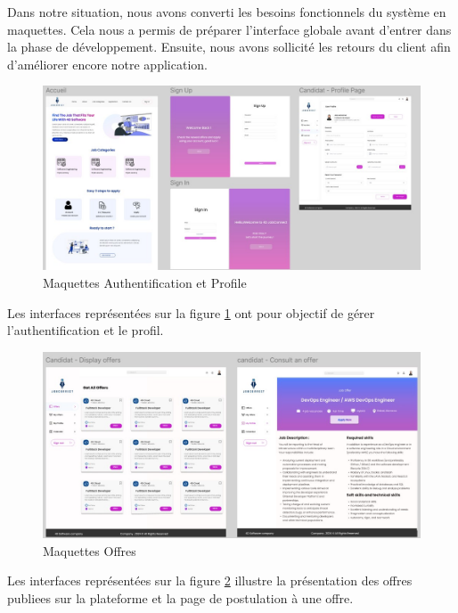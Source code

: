 Dans notre situation, nous avons converti les besoins fonctionnels du système 
en maquettes. Cela nous a permis de préparer l'interface globale 
avant d'entrer dans la phase de développement. Ensuite, 
nous avons sollicité les retours du client 
afin d'améliorer encore notre application.
\newline



\begin{figure}[htbp]
   \centering
   \includegraphics[scale=0.85]{Images/1.jpg} %
   \caption{Maquettes Authentification et Profile}
   \label{fig:maquette1}
\end{figure}

Les interfaces représentées sur la figure \ref{fig:maquette1} ont pour objectif de gérer l'authentification et le profil.
\\

\vspace{4cm}
\begin{figure}[htbp]
   \centering
   \includegraphics[scale=0.9]{Images/2.jpg} 
   \caption{Maquettes Offres}
   \label{fig:maquette2}
\end{figure}
Les interfaces représentées sur la figure \ref{fig:maquette2} illustre la présentation des offres publiees sur la plateforme et la page de postulation à une offre.

